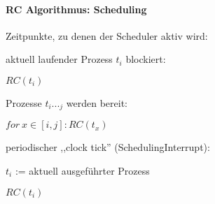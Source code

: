 \documentclass[a4paper]{article}
\begin{document}
\begin{multicols}{3}


    \paragraph{RC Algorithmus: Scheduling}

    Zeitpunkte, zu denen der Scheduler aktiv wird:

    \begin{enumerate*}
        \item
        aktuell laufender Prozess $t_i$ blockiert:
        \begin{itemize*}
            \item $RC(t_i)$
        \end{itemize*}
        \item
        Prozesse $t_i..._j$ werden bereit:
        \begin{itemize*}
            \item $for\ x\in[i,j]: RC(t_x)$
        \end{itemize*}
        \item
        periodischer ,,clock tick'' (SchedulingInterrupt):
        \begin{itemize*}
            \item $t_i$ := aktuell ausgeführter Prozess
            \item $RC(t_i)$
        \end{itemize*}
    \end{enumerate*}


\end{multicols}
\end{document}
